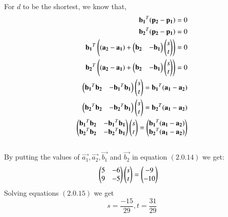 \documentclass[journal,12pt,twocolumn]{IEEEtran}
\begin{document}
For $d$ to be the shortest, we know that,
\begin{align}
\mathbf{b_1}^T(\mathbf{p_2}-\mathbf{p_1})=0\\
\mathbf{b_2}^T(\mathbf{p_2}-\mathbf{p_1})=0\\
\mathbf{b_1}^T\left((\mathbf{a_2}-\mathbf{a_1})+\begin{pmatrix}\mathbf{b_2}&-\mathbf{b_1}\end{pmatrix}\begin{pmatrix}s\\t\end{pmatrix}\right)=0\\
\mathbf{b_2}^T\left((\mathbf{a_2}-\mathbf{a_1})+\begin{pmatrix}\mathbf{b_2}&-\mathbf{b_1}\end{pmatrix}\begin{pmatrix}s\\t\end{pmatrix}\right)=0\\
\begin{pmatrix}\mathbf{b_1}^T\mathbf{b_2}&-\mathbf{b_1}^T\mathbf{b_1}\end{pmatrix}\begin{pmatrix}s\\t\end{pmatrix}=\mathbf{b_1}^T(\mathbf{a_1}-\mathbf{a_2})\\
\begin{pmatrix}\mathbf{b_2}^T\mathbf{b_2}&-\mathbf{b_2}^T\mathbf{b_1}\end{pmatrix}\begin{pmatrix}s\\t\end{pmatrix}=\mathbf{b_2}^T(\mathbf{a_1}-\mathbf{a_2})\\
\begin{pmatrix}\mathbf{b_1}^T\mathbf{b_2}&-\mathbf{b_1}^T\mathbf{b_1}\\\mathbf{b_2}^T\mathbf{b_2}&-\mathbf{b_2}^T\mathbf{b_1}\end{pmatrix}\begin{pmatrix}s\\t\end{pmatrix}=\begin{pmatrix}\mathbf{b_1}^T(\mathbf{a_1}-\mathbf{a_2})\\\mathbf{b_2}^T(\mathbf{a_1}-\mathbf{a_2})\end{pmatrix}
\end{align}\\
By putting the values of $\vec{a_1}, \vec{a_2}, \vec{b_1}$ and $\vec{b_2}$ in equation $(2.0.14)$ we get:
\begin{align}
\begin{pmatrix}5&-6\\9&-5\end{pmatrix}\begin{pmatrix}s\\t\end{pmatrix}&=\begin{pmatrix}-9\\-10\end{pmatrix}
\end{align}
Solving equations $(2.0.15)$ we get
$$s=\frac{-15}{29}, t=\frac{31}{29}$$
\end{document}
